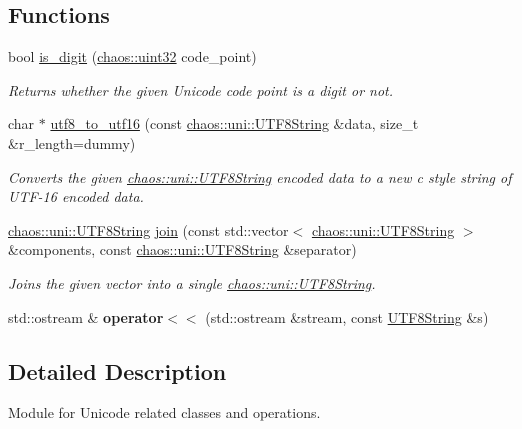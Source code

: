 \subsection*{Functions}
\begin{DoxyCompactItemize}
\item 
bool \hyperlink{namespacechaos_1_1uni_a25a7549a0378aeac227c881220c23640}{is\-\_\-digit} (\hyperlink{namespacechaos_a3b3a47ba1e284655bf1a30c441121c60}{chaos\-::uint32} code\-\_\-point)
\begin{DoxyCompactList}\small\item\em Returns whether the given Unicode code point is a digit or not. \end{DoxyCompactList}\item 
char $\ast$ \hyperlink{namespacechaos_1_1uni_aa2ecaabcd23d2df0cddcc6d00a4a3485}{utf8\-\_\-to\-\_\-utf16} (const \hyperlink{classchaos_1_1uni_1_1_u_t_f8_string}{chaos\-::uni\-::\-U\-T\-F8\-String} \&data, size\-\_\-t \&r\-\_\-length=dummy)
\begin{DoxyCompactList}\small\item\em Converts the given \hyperlink{classchaos_1_1uni_1_1_u_t_f8_string}{chaos\-::uni\-::\-U\-T\-F8\-String} encoded data to a new c style string of U\-T\-F-\/16 encoded data. \end{DoxyCompactList}\item 
\hyperlink{classchaos_1_1uni_1_1_u_t_f8_string}{chaos\-::uni\-::\-U\-T\-F8\-String} \hyperlink{namespacechaos_1_1uni_ad2a77983423c8b10e2b18cae6f35d329}{join} (const std\-::vector$<$ \hyperlink{classchaos_1_1uni_1_1_u_t_f8_string}{chaos\-::uni\-::\-U\-T\-F8\-String} $>$ \&components, const \hyperlink{classchaos_1_1uni_1_1_u_t_f8_string}{chaos\-::uni\-::\-U\-T\-F8\-String} \&separator)
\begin{DoxyCompactList}\small\item\em Joins the given vector into a single \hyperlink{classchaos_1_1uni_1_1_u_t_f8_string}{chaos\-::uni\-::\-U\-T\-F8\-String}. \end{DoxyCompactList}\item 
\hypertarget{namespacechaos_1_1uni_ab20a8223562ec1ee8f663bda07c7a3ad}{std\-::ostream \& {\bfseries operator$<$$<$} (std\-::ostream \&stream, const \hyperlink{classchaos_1_1uni_1_1_u_t_f8_string}{U\-T\-F8\-String} \&s)}\label{namespacechaos_1_1uni_ab20a8223562ec1ee8f663bda07c7a3ad}

\end{DoxyCompactItemize}


\subsection{Detailed Description}
Module for Unicode related classes and operations. 

